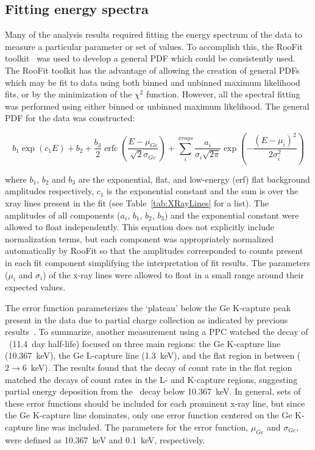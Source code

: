 		\subsection{Fitting energy spectra}
		\label{sec:BeGeSpecFit}	

	Many of the analysis results required fitting the energy spectrum of the data to measure a particular parameter or set of values.  To accomplish this, the RooFit toolkit~\cite{ver03aa} was used to develop a general PDF which could be consistently used.  The RooFit toolkit has the advantage of allowing the creation of general PDFs which may be fit to data using both binned and unbinned maximum likelihood fits, or by the minimization of the $\chi^{2}$ function.  However, all the spectral fitting was performed using either binned or unbinned maximum likelihood.  The general PDF for the data was constructed:
	
			\begin{equation}
				b_{1} \exp\left(c_{1} E\right) + b_{2} + \frac{b_{3}}{2}\operatorname{erfc}\left( \frac{E - \mu_{Ge}}{\sqrt{2} \sigma_{Ge}}\right) + 
					\sum^{xrays}_{i} \frac{a_{i}}{\sigma_{i}\sqrt{2 \pi}} 
					\exp\left(-\frac{(E - \mu_{i})^{2}}{2 \sigma_{i}^{2}}\right)
				\label{eqn:InitialFitEqn}
			\end{equation}

where $b_{1}$, $b_{2}$ and $b_{3}$ are the exponential, flat, and low-energy (erf) flat background amplitudes respectively, $c_{1}$ is the exponential constant and the sum is over the xray lines present in the fit (see Table~\ref{tab:XRayLines} for a list).  The amplitudes of all components ($a_{i}$, $b_{1}$, $b_{2}$, $b_{3}$) and the exponential constant were allowed to float independently.  This equation does not explicitly include normalization terms, but each component was appropriately normalized automatically by RooFit so that the amplitudes corresponded to counts present in each fit component simplifying the interpretation of fit results.  The parameters ($\mu_{i}$ and $\sigma_{i}$) of the x-ray lines were allowed to float in a small range around their expected values.   

The error function parameterizes the `plateau' below the Ge K-capture peak present in the data due to partial charge collection as indicated by previous results~\cite{Barbeau:2009fk}.  To summarize, another measurement using a PPC watched  the decay of \gersevenone~(11.4~day half-life) focused on three main regions: the Ge K-capture line (10.367~keV), the Ge L-capture line (1.3~keV), and the flat region in between ($2\to6$~keV).  The results found that the decay of count rate in the flat region matched the decays of count rates in the L- and K-capture regions, suggesting partial energy deposition from the \gersevenone~decay below 10.367~keV.  In general, sets of these error functions should be included for each prominent x-ray line, but since the Ge K-capture line dominates, only one error function centered on the Ge K-capture line was included.  The parameters for the error function, $\mu_{Ge}$ and $\sigma_{Ge}$, were defined as 10.367~keV and 0.1~keV, respectively.  

